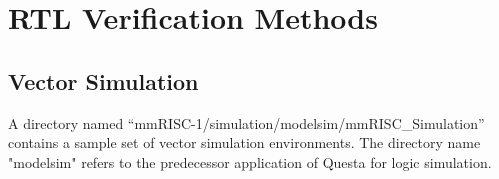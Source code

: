\section{RTL Verification Methods}


\subsection{Vector Simulation}

A directory named “mmRISC-1/simulation/modelsim/mmRISC\_Simulation” contains a sample set of vector simulation environments. The directory name "modelsim" refers to the predecessor application of Questa for logic simulation.

